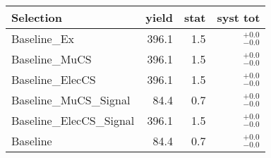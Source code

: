 
\begin{tabular}{l|rrr}
\toprule
                 Selection & yield & stat & syst tot   \\ 
\midrule
              Baseline\_Ex & 396.1 & 1.5 & ${}^{+0.0}_{-0.0}$ \\
            Baseline\_MuCS & 396.1 & 1.5 & ${}^{+0.0}_{-0.0}$ \\
          Baseline\_ElecCS & 396.1 & 1.5 & ${}^{+0.0}_{-0.0}$ \\
    Baseline\_MuCS\_Signal & 84.4 & 0.7 & ${}^{+0.0}_{-0.0}$ \\
  Baseline\_ElecCS\_Signal & 396.1 & 1.5 & ${}^{+0.0}_{-0.0}$ \\
                  Baseline & 84.4 & 0.7 & ${}^{+0.0}_{-0.0}$ \\
\bottomrule
\end{tabular}
